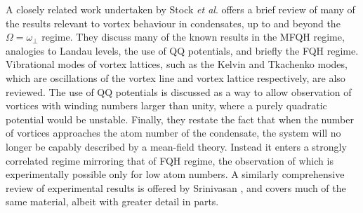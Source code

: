 A closely related work undertaken by Stock \textit{et al}. \cite{BEC:Stock_laserphyslett_2005} offers a brief review of many of the results relevant to vortex behaviour in condensates, up to and beyond the $\Omega=\omega_{\perp}$ regime. They discuss many of the known results in the MFQH regime, analogies to Landau levels, the use of QQ potentials, and briefly the FQH regime. Vibrational modes of vortex lattices, such as the Kelvin and Tkachenko modes, which are oscillations of the vortex line and vortex lattice respectively, are also reviewed. The use of QQ potentials is discussed as a way to allow observation of vortices with winding numbers larger than unity, where a purely quadratic potential would be unstable. Finally, they restate the fact that when the number of vortices approaches the atom number of the condensate, the system will no longer be capably described by a mean-field theory. Instead it enters a strongly correlated regime mirroring that of FQH regime, the observation of which is experimentally possible only for low atom numbers. A similarly comprehensive review of experimental results is offered by Srinivasan \cite{BEC:Srinivasen_pramana_2006}, and covers much of the same material, albeit with greater detail in parts.

